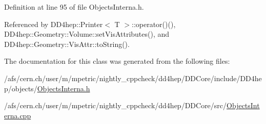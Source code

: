 Definition at line 95 of file Objects\+Interna.\+h.



Referenced by D\+D4hep\+::\+Printer$<$ T $>$\+::operator()(), D\+D4hep\+::\+Geometry\+::\+Volume\+::set\+Vis\+Attributes(), and D\+D4hep\+::\+Geometry\+::\+Vis\+Attr\+::to\+String().



The documentation for this class was generated from the following files\+:\begin{DoxyCompactItemize}
\item 
/afs/cern.\+ch/user/m/mpetric/nightly\+\_\+cppcheck/dd4hep/\+D\+D\+Core/include/\+D\+D4hep/objects/\hyperlink{_objects_interna_8h}{Objects\+Interna.\+h}\item 
/afs/cern.\+ch/user/m/mpetric/nightly\+\_\+cppcheck/dd4hep/\+D\+D\+Core/src/\hyperlink{_objects_interna_8cpp}{Objects\+Interna.\+cpp}\end{DoxyCompactItemize}
